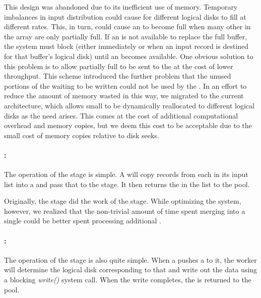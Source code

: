 This design was abandoned due to its inefficient use of memory. Temporary
imbalances in input distribution could cause \ldbuffers for different logical
disks to fill at different rates.  This, in turn, could cause an \ldbuffer to
become full when many other \ldbuffers in the array are only partially full.
If an \ldbuffer is not available to replace the full buffer, the system must
block (either immediately or when an input record is destined for that buffer's
logical disk) until an \ldbuffer becomes available.  One obvious solution to
this problem is to allow partially full \ldbuffers to be sent to the \writers
at the cost of lower \writer throughput. This scheme introduced the further
problem that the unused portions of the \ldbuffers waiting to be written could
not be used by the \ldts.  In an effort to reduce the amount of memory wasted
in this way, we migrated to the current architecture, which allows small
\ldbuffers to be dynamically reallocated to different logical disks as the need
arises.  This comes at the cost of additional computational overhead and memory
copies, but we deem this cost to be acceptable due to the small cost of memory
copies relative to disk seeks.

\paragraph{\coalescer:} The operation of the \coalescer stage is simple.  A
\coalescer will copy records from each \ldbuffer in its input \ldbuffer list
into a \writerbuffer and pass that \writerbuffer to the \writer stage. It then
returns the \ldbuffers in the list to the \ldbuffer pool.

Originally, the \ldts stage did the work of the \coalescer stage.  While
optimizing the system, however, we realized that the non-trivial amount of time
spent merging \ldbuffers into a single \writerbuffer could be better spent
processing additional \nodebuffers.

\paragraph{\writer:}  The operation of the \writer stage is also quite simple.
When a \coalescer pushes a \writerbuffer to it, the \writer worker will
determine the logical disk corresponding to that \writerbuffer and write out
the data using a blocking \textit{write()} system call.  When the write
completes, the \writerbuffer is returned to the pool.


